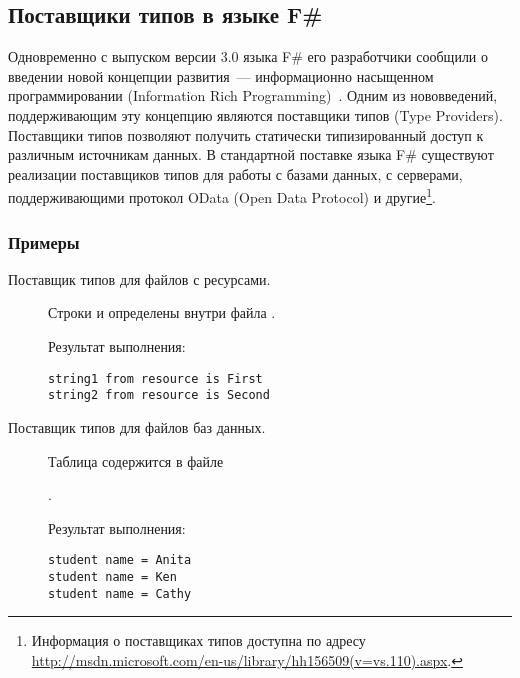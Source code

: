\subsection{Поставщики типов в языке F\#}\label{f-sharp-type-providers}
Одновременно с выпуском версии 3.0 языка F\# его разработчики сообщили о введении новой концепции развития~--- информационно насыщенном программировании (Information Rich Programming)~\cite{joepamer2011}.
Одним из нововведений, поддерживающим эту концепцию являются поставщики типов (Type Providers).
Поставщики типов позволяют получить статически типизированный доступ к различным источникам данных.
В стандартной поставке языка F\# существуют реализации поставщиков типов для работы с базами данных, с серверами, поддерживающими протокол OData (Open Data Protocol) и другие\footnote{Информация о поставщиках типов доступна по адресу \url{http://msdn.microsoft.com/en-us/library/hh156509(v=vs.110).aspx}.}.

\subsubsection{Примеры}
\begin{description}
\item[Поставщик типов для файлов с ресурсами.] Строки  и  определены внутри файла .


Результат выполнения:
\begin{code}\begin{lstlisting}
string1 from resource is First
string2 from resource is Second
\end{lstlisting}\end{code}

\item[Поставщик типов для файлов баз данных.] Таблица  содержится в файле 

.


Результат выполнения:
\begin{code}\begin{lstlisting}
student name = Anita
student name = Ken
student name = Cathy
\end{lstlisting}\end{code}

\end{description}    